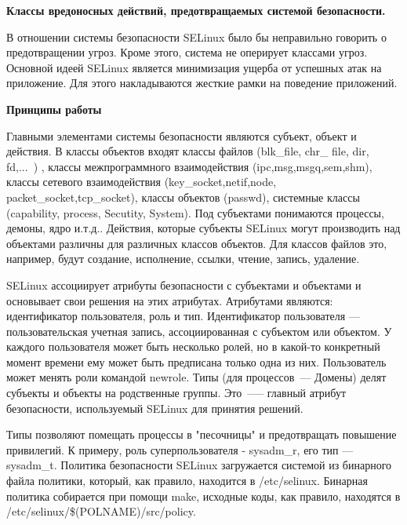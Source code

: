\bigskip 
{\bfseries Классы вредоносных действий, предотвращаемых 
	системой безопасности.} 

В отношении системы безопасности SELinux было бы неправильно 
говорить о предотвращении угроз. Кроме этого, система не 
оперирует классами угроз. Основной идеей SELinux является 
минимизация ущерба от успешных атак на приложение. Для 
этого накладываются жесткие рамки на поведение приложений. 


\bigskip
{\bfseries Принципы работы}

Главными элементами системы безопасности 
являются субъект, объект и действия. В классы 
объектов входят классы файлов (blk\_file, chr\_
file, dir, fd,...\ ) ,  классы межпрограммного 
взаимодействия (ipc,msg,msgq,sem,shm), классы 
сетевого взаимодействия (key\_socket,netif,node,
packet\_socket,tcp\_socket), классы объектов 
(passwd), системные классы (capability, process,
Secutity, System). Под субъектами понимаются 
процессы, демоны, ядро и.т.д.. Действия, которые субъекты 
SELinux могут производить над объектами 
различны для различных классов объектов. 
Для классов файлов это, например, 
будут создание, исполнение, ссылки, чтение, запись, 
удаление. 

SELinux ассоциирует атрибуты безопасности 
с субъектами и объектами и основывает свои решения 
на этих атрибутах. Атрибутами являются: идентификатор 
пользователя, роль и тип. Идентификатор пользователя 
— пользовательская учетная запись, ассоциированная с 
субъектом или объектом. У каждого пользователя может 
быть несколько ролей, но в какой-то конкретный момент
времени ему может быть предписана только одна из них. 
Пользователь может менять роли командой newrole. Типы 
(для процессов~--- Домены) делят субъекты и объекты на родственные 
группы. Это~--— главный атрибут безопасности, используемый 
SELinux для принятия решений. 

Типы позволяют помещать 
процессы в "песочницы" и предотвращать повышение 
привилегий. К примеру, роль суперпользователя - 
sysadm\_r, его тип — sysadm\_t. Политика безопасности 
SELinux загружается системой из бинарного файла политики,
который, как правило, находится в /etc/selinux. 
Бинарная политика собирается при помощи make, исходные 
коды, как правило, находятся в /etc/selinux/\$(POLNAME)/src/policy.

